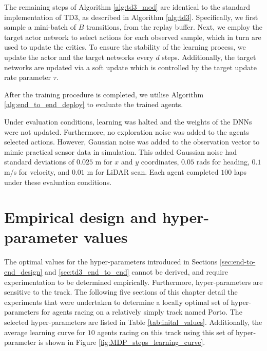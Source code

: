 The remaining steps of Algorithm \ref{alg:td3_mod} are identical to the standard implementation of TD3, as described in Algorithm \ref{alg:td3}. 
Specifically, we first sample a mini-batch of $B$ transitions, from the replay buffer.
Next, we employ the target actor network to select actions for each observed sample, which in turn are used to update the critics. 
To ensure the stability of the learning process, we update the actor and the target networks every $d$ steps. 
Additionally, the target networks are updated via a soft update which is controlled by the target update rate parameter $\tau$. 

After the training procedure is completed, we utilise Algorithm \ref{alg:end_to_end_deploy} to evaluate the trained agents.

Under evaluation conditions, learning was halted and the weights of the DNNs were not updated.
Furthermore, no exploration noise was added to the agents selected actions. 
However, Gaussian noise was added to the observation vector to mimic practical sensor data in simulation. 
This added Gaussian noise had standard deviations of $0.025$ m for $x$ and $y$ coordinates, $0.05$ rads for heading, $0.1$ m/s for velocity, and $0.01$ m for LiDAR scan. 
Each agent completed $100$ laps under these evaluation conditions.







\section{Empirical design and hyper-parameter values}\label{sec:ete_empirical_design}

The optimal values for the hyper-parameters introduced in Sections \ref{sec:end-to-end_design} and \ref{sec:td3_end_to_end} cannot be derived, 
and require experimentation to be determined empirically. 
Furthermore, hyper-parameters are sensitive to the track.
The following five sections of this chapter detail the experiments that were undertaken to determine a locally optimal set of hyper-parameters for agents racing on a relatively simply track named Porto.
The selected hyper-parameters are listed in Table \ref{tab:inital_values}.
Additionally, the average learning curve for $10$ agents racing on this track using this set of hyper-parameter is shown in Figure \ref{fig:MDP_steps_learning_curve}.

